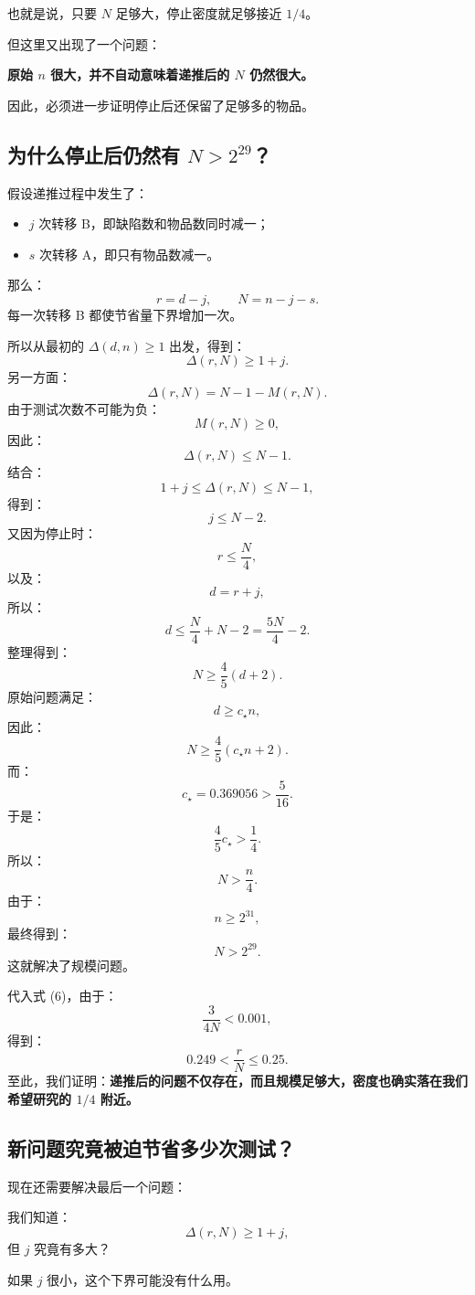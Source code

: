 \documentclass[UTF8,11pt]{ctexart}
\begin{document}
也就是说，只要 $N$ 足够大，停止密度就足够接近 $1/4$。

但这里又出现了一个问题：

\textbf{原始 $n$ 很大，并不自动意味着递推后的 $N$ 仍然很大。}

因此，必须进一步证明停止后还保留了足够多的物品。

\subsection{为什么停止后仍然有 $N>2^{29}$？}
假设递推过程中发生了：
\begin{itemize}
\item $j$ 次转移 B，即缺陷数和物品数同时减一；
\item $s$ 次转移 A，即只有物品数减一。
\end{itemize}
那么：
\[r=d-j,\qquad N=n-j-s.\]
每一次转移 B 都使节省量下界增加一次。

所以从最初的 $\Delta(d,n)\ge1$ 出发，得到：
\begin{equation}\boxed{\Delta(r,N)\ge1+j.}\tag{7}\end{equation}
另一方面：
\[\Delta(r,N)=N-1-M(r,N).\]
由于测试次数不可能为负：
\[M(r,N)\ge0,\]
因此：
\[\Delta(r,N)\le N-1.\]
结合：
\[1+j\le\Delta(r,N)\le N-1,\]
得到：
\[j\le N-2.\]
又因为停止时：
\[r\le\frac N4,\]
以及：
\[d=r+j,\]
所以：
\[d\le\frac N4+N-2=\frac{5N}{4}-2.\]
整理得到：
\[N\ge\frac45(d+2).\]
原始问题满足：
\[d\ge c_\star n,\]
因此：
\[N\ge\frac45(c_\star n+2).\]
而：
\[c_\star=0.369056>\frac5{16}.\]
于是：
\[\frac45c_\star>\frac14.\]
所以：
\[N>\frac n4.\]
由于：
\[n\ge2^{31},\]
最终得到：
\begin{equation}\boxed{N>2^{29}.}\tag{8}\end{equation}
这就解决了规模问题。

代入式 (6)，由于：
\[\frac3{4N}<0.001,\]
得到：
\begin{equation}\boxed{0.249<\frac rN\le0.25.}\tag{9}\end{equation}
至此，我们证明：\textbf{递推后的问题不仅存在，而且规模足够大，密度也确实落在我们希望研究的 $1/4$ 附近。}

\subsection{新问题究竟被迫节省多少次测试？}
现在还需要解决最后一个问题：

我们知道：
\[\Delta(r,N)\ge1+j,\]
但 $j$ 究竟有多大？

如果 $j$ 很小，这个下界可能没有什么用。
\end{document}
